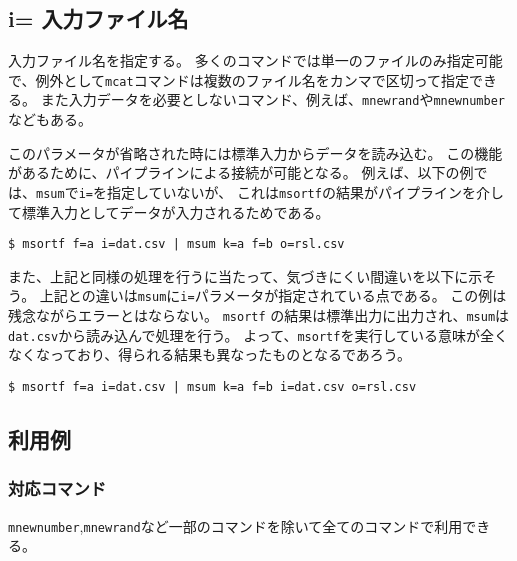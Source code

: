 
%

\subsection{i= 入力ファイル名\label{sect:option_i}}
入力ファイル名を指定する。
多くのコマンドでは単一のファイルのみ指定可能で、例外として\verb|mcat|コマンドは複数のファイル名をカンマで区切って指定できる。
また入力データを必要としないコマンド、例えば、\verb|mnewrand|や\verb|mnewnumber|などもある。

このパラメータが省略された時には標準入力からデータを読み込む。
この機能があるために、パイプラインによる接続が可能となる。
例えば、以下の例では、\verb|msum|で\verb|i=|を指定していないが、
これは\verb|msortf|の結果がパイプラインを介して標準入力としてデータが入力されるためである。
\begin{Verbatim}[baselinestretch=0.7,frame=single]
$ msortf f=a i=dat.csv | msum k=a f=b o=rsl.csv
\end{Verbatim}

また、上記と同様の処理を行うに当たって、気づきにくい間違いを以下に示そう。
上記との違いは\verb|msum|に\verb|i=|パラメータが指定されている点である。
この例は残念ながらエラーとはならない。
\verb|msortf| の結果は標準出力に出力され、\verb|msum|は\verb|dat.csv|から読み込んで処理を行う。
よって、\verb|msortf|を実行している意味が全くなくなっており、得られる結果も異なったものとなるであろう。

\begin{Verbatim}[baselinestretch=0.7,frame=single]
$ msortf f=a i=dat.csv | msum k=a f=b i=dat.csv o=rsl.csv
\end{Verbatim}

\subsection*{利用例}


\subsubsection*{対応コマンド}
\verb|mnewnumber|,\verb|mnewrand|など一部のコマンドを除いて全てのコマンドで利用できる。

%

